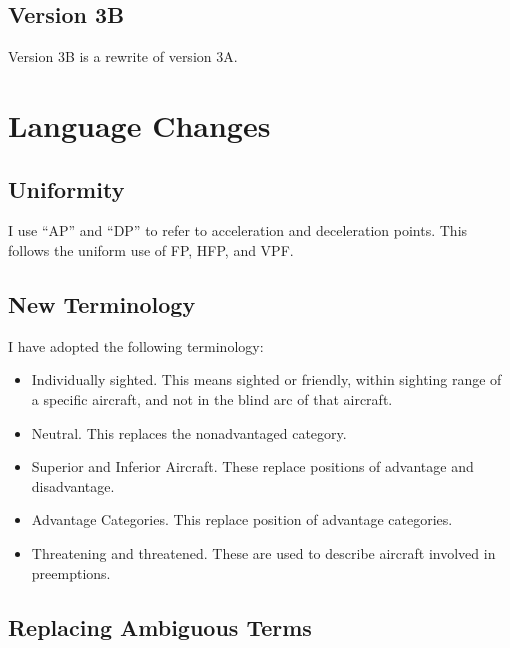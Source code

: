 \documentclass[10pt]{report}
\begin{document}
\subsection{Version 3B}

Version 3B is a rewrite of version 3A.
    

\section{Language Changes}

%

\subsection{Uniformity}

I use “AP” and “DP” to refer to acceleration and deceleration points. This follows the uniform use of FP, HFP, and VPF.

\subsection{New Terminology}

I have adopted the following terminology:

\begin{itemize}
    \item Individually sighted. This means sighted or friendly, within sighting range of a specific aircraft, and not in the blind arc of that aircraft.
    \item Neutral. This replaces the nonadvantaged category.
    \item Superior and Inferior Aircraft. These replace positions of advantage and disadvantage.
    \item Advantage Categories. This replace position of advantage categories.
    \item Threatening and threatened. These are used to describe aircraft involved in preemptions.
\end{itemize}



\subsection{Replacing Ambiguous Terms}
\end{document}
